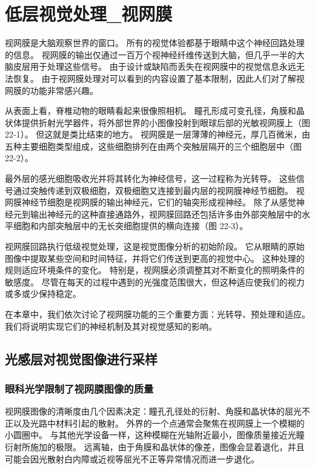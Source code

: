 \chapter{低层视觉处理\_视网膜}

视网膜是大脑观察世界的窗口。 所有的视觉体验都基于眼睛中这个神经回路处理的信息。 视网膜的输出仅通过一百万个视神经纤维传送到大脑，但几乎一半的大脑皮层用于处理这些信号。 由于设计或缺陷而丢失在视网膜中的视觉信息永远无法恢复。 由于视网膜处理对可以看到的内容设置了基本限制，因此人们对了解视网膜的功能非常感兴趣。

从表面上看，脊椎动物的眼睛看起来很像照相机。 瞳孔形成可变孔径，角膜和晶状体提供折射光学器件，将外部世界的小图像投射到眼球后部的光敏视网膜上（图 22-1）。 但这就是类比结束的地方。 视网膜是一层薄薄的神经元，厚几百微米，由五种主要细胞类型组成，这些细胞排列在由两个突触层隔开的三个细胞层中（图 22-2）。

最外层的感光细胞吸收光并将其转化为神经信号，这一过程称为光转导。 这些信号通过突触传递到双极细胞，双极细胞又连接到最内层的视网膜神经节细胞。 视网膜神经节细胞是视网膜的输出神经元，它们的轴突形成视神经。 除了从感觉神经元到输出神经元的这种直接通路外，视网膜回路还包括许多由外部突触层中的水平细胞和内部突触层中的无长突细胞提供的横向连接（图 22-3）。

视网膜回路执行低级视觉处理，这是视觉图像分析的初始阶段。 它从眼睛的原始图像中提取某些空间和时间特征，并将它们传送到更高的视觉中心。 这种处理的规则适应环境条件的变化。 特别是，视网膜必须调整其对不断变化的照明条件的敏感度。 尽管在每天的过程中遇到的光强度范围很大，但这种适应使我们的视力或多或少保持稳定。

在本章中，我们依次讨论了视网膜功能的三个重要方面：光转导、预处理和适应。 我们将说明实现它们的神经机制及其对视觉感知的影响。



\section{光感层对视觉图像进行采样}


\subsection{眼科光学限制了视网膜图像的质量}
视网膜图像的清晰度由几个因素决定：瞳孔孔径处的衍射、角膜和晶状体的屈光不正以及光路中材料引起的散射。 外界的一个点通常会聚焦在视网膜上一个模糊的小圆圈中。 与其他光学设备一样，这种模糊在光轴附近最小，图像质量接近光瞳衍射所施加的极限。 远离轴，由于角膜和晶状体的像差，图像会显着退化，并且可能会因光散射白内障或近视等屈光不正等异常情况而进一步退化。

